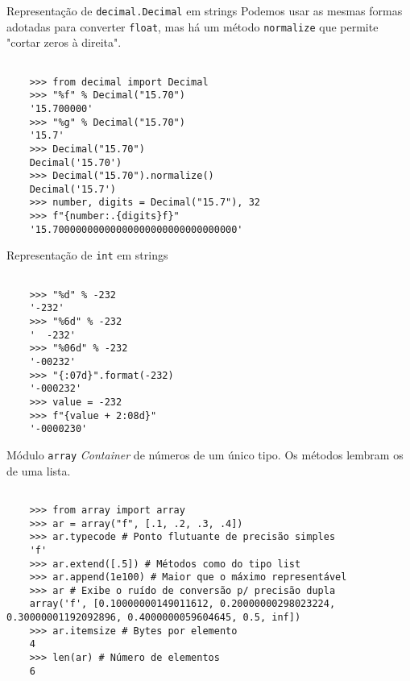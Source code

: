 \documentclass[utf8]{beamer}
\begin{document}
\begin{frame}[fragile]{Representação de \texttt{decimal.Decimal}
                       em strings}
  Podemos usar as mesmas formas adotadas
  para converter \texttt{float},
  mas há um método \texttt{normalize}
  que permite "cortar zeros à direita".

  \begin{verbatim}

    >>> from decimal import Decimal
    >>> "%f" % Decimal("15.70")
    '15.700000'
    >>> "%g" % Decimal("15.70")
    '15.7'
    >>> Decimal("15.70")
    Decimal('15.70')
    >>> Decimal("15.70").normalize()
    Decimal('15.7')
    >>> number, digits = Decimal("15.7"), 32
    >>> f"{number:.{digits}f}"
    '15.70000000000000000000000000000000'

  \end{verbatim}

\end{frame}


\begin{frame}[fragile]{Representação de \texttt{int} em strings}
  \begin{verbatim}

    >>> "%d" % -232
    '-232'
    >>> "%6d" % -232
    '  -232'
    >>> "%06d" % -232
    '-00232'
    >>> "{:07d}".format(-232)
    '-000232'
    >>> value = -232
    >>> f"{value + 2:08d}"
    '-0000230'

  \end{verbatim}
\end{frame}


\begin{frame}[fragile]{Módulo \texttt{array}}
  \emph{Container} de números de um único tipo.
  Os métodos lembram os de uma lista.

  \begin{verbatim}

    >>> from array import array
    >>> ar = array("f", [.1, .2, .3, .4])
    >>> ar.typecode # Ponto flutuante de precisão simples
    'f'
    >>> ar.extend([.5]) # Métodos como do tipo list
    >>> ar.append(1e100) # Maior que o máximo representável
    >>> ar # Exibe o ruído de conversão p/ precisão dupla
    array('f', [0.10000000149011612, 0.20000000298023224, 0.30000001192092896, 0.4000000059604645, 0.5, inf])
    >>> ar.itemsize # Bytes por elemento
    4
    >>> len(ar) # Número de elementos
    6

  \end{verbatim}

\end{frame}
\end{document}
